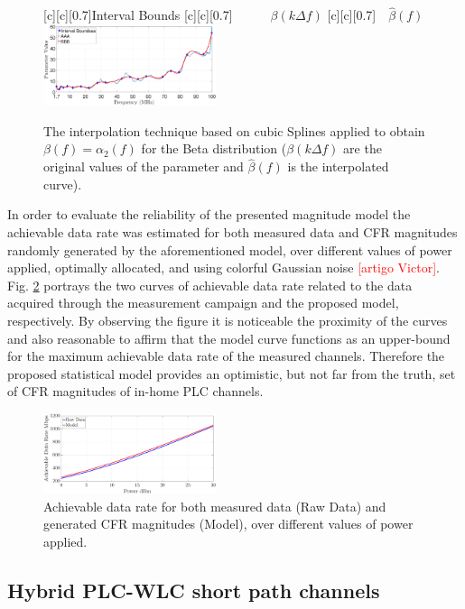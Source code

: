 \documentclass[journal]{IEEEtran}
\begin{document}
\begin{figure}[h!]
	\centering
	[c][0.7]{Interval Bounds}
	[c][0.7]{~~~~~~$\beta(k \Delta f)$}
	[c][0.7]{~~$\hat{\beta}(f)$}
	\includegraphics[width=0.45\textwidth]{images/Beta_fit_1.7.eps}
	\caption{The interpolation technique based on cubic Splines applied to obtain $\beta(f) = \alpha_2(f)$ for the Beta distribution ($\beta(k \Delta f)$ are the original values of the parameter and $\hat{\beta}(f)$ is the interpolated curve).}
	\label{Fit_beta}
\end{figure}

In order to evaluate the reliability of the presented magnitude model the achievable data rate was estimated for both measured data and \ac{CFR} magnitudes randomly generated by the aforementioned model, over different values of power applied, optimally allocated, and using colorful Gaussian noise \textcolor{red}{[artigo Victor]}. Fig. \ref{Cap_PLC} portrays the two curves of achievable data rate related to the data acquired through the measurement campaign and the proposed model, respectively. By observing the figure it is noticeable the proximity of the curves and also reasonable to affirm that the model curve functions as an upper-bound for the maximum achievable data rate of the measured channels. Therefore the proposed statistical model provides an optimistic, but not far from the truth, set of \ac{CFR} magnitudes of in-home \ac{PLC} channels.

\begin{figure}[h]
	\centering
	\includegraphics[width=0.45\textwidth]{images/Capacidade.eps}
	\caption{Achievable data rate for both measured data (Raw Data) and generated CFR magnitudes (Model), over different values of power applied.}
	\label{Cap_PLC}
\end{figure}

\subsection{Hybrid PLC-WLC short path channels}\label{sec:MMHYBS}
\end{document}
